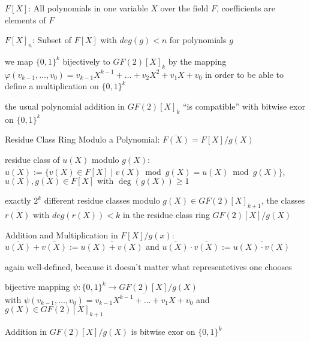 \documentclass[landscape, a4paper]{article}
\begin{document}
\begin{minipage}[t]{0.2\linewidth}
	\begin{betterlist}
		\item $F[X]$: All polynomials in one variable $X$ over the field $F$, coefficients are elements of $F$
		\item $F[X]_n$: Subset of $F[X]$ with $deg(g) < n$ for polynomials $g$
		\item we map $\{0,1\}^k$ bijectively to $GF(2)[X]_k$ by the mapping $\varphi(v_{k-1}, \ldots, v_0) = v_{k-1} X^{k-1} + \ldots + v_2 X^2 + v_1 X + v_0$ in order to be able to define a \alert{multiplication} on $\{0,1\}^k$
		\begin{betterlist}
			\item the usual \alert{polynomial addition} in $GF(2)[X]_k$ \enquote{is compatible} with bitwise exor on $\{0,1\}^k$
		\end{betterlist}
		\item \alert{Residue Class Ring Modulo a Polynomial:} $\overline{F(X)} = F[X] / g(X)$%
		\begin{betterlist}
			\item \alert{residue class of $u(X)$ modulo $g(X)$}: $\overline{u(X)}:=\{v(X) \in F[X] \mid v(X) \bmod g(X)=u(X) \bmod g(X)\}$,\quad$u(X),g(X) \in F[X] \text { with } \operatorname{deg}(g(X))\geq 1$
			\item exactly $2^k$ different residue classes modulo $g(X)\in GF(2)[X]_{k+1}$, the classes $\overline{r(X)}$ with $deg(r(X)) < k$ in the residue class ring $GF(2)[X]/g(X)$
			\item \alert{Addition and Multiplication in $F[X]/g(x)$:} $\overline{u(X)}+\overline{v(X)}:=\overline{u(X)+v(X)}$ and $\overline{u(X)} \cdot \overline{v(X)}:=\overline{u(X) \cdot v(X)}$
			\begin{betterlist}
				\item again well-defined, because it doesn't matter what representetives one chooses
				\item \alert{bijective mapping} $\psi:\{0,1\}^k\rightarrow G F(2)[X] / g(X)$\\
				with $\psi\left(v_{k-1}, \ldots, v_0\right)=\overline{v_{k-1} X^{k-1}+\ldots+v_1 X+v_0}$ and $g(X)\in GF(2)[X]_{k+1}$
				\item \alert{Addition} in $GF(2)[X]/g(X)$ is bitwise exor on $\{0,1\}^k$%

\end{betterlist}
\end{betterlist}
\end{betterlist}
\end{minipage}
\end{document}

